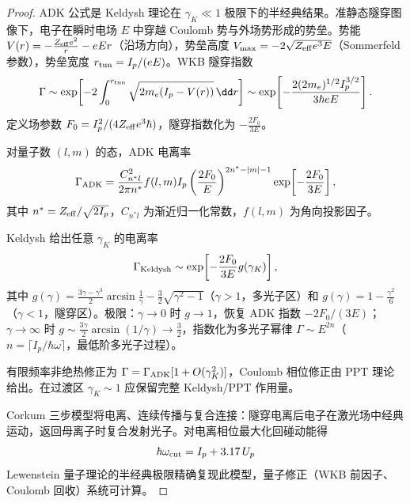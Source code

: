 \begin{proof}
ADK 公式是 Keldysh 理论在 \(\gamma_K\ll1\) 极限下的半经典结果。准静态隧穿图像下，电子在瞬时电场 \(E\) 中穿越 Coulomb 势与外场势形成的势垒。势能 \(V(r)=-\frac{Z_{\rm eff}e^2}{r}-eEr\)（沿场方向），势垒高度 \(V_{\rm max}=-2\sqrt{Z_{\rm eff}e^3E}\)（Sommerfeld 参数），势垒宽度 \(r_{\rm tun}=I_p/(eE)\)。WKB 隧穿指数
\begin{equation*}
  \Gamma\sim\exp\!\left[-2\int_0^{r_{\rm tun}}\sqrt{2m_e(I_p-V(r))}\,\dd r\right]\sim\exp\!\left[-\frac{2(2m_e)^{1/2}I_p^{3/2}}{3\hbar eE}\right].
\end{equation*}
定义场参数 \(F_0=I_p^2/(4Z_{\rm eff}e^3\hbar)\)，隧穿指数化为 \(-\frac{2F_0}{3E}\)。

对量子数 \((l,m)\) 的态，ADK 电离率
\begin{equation}
  \Gamma_{\rm ADK}=\frac{C_{n^*l}^2}{2\pi n^*}f(l,m)I_p\left(\frac{2F_0}{E}\right)^{2n^*-|m|-1}\exp\!\left[-\frac{2F_0}{3E}\right],
  \label{eq:strong-field-adk}
\end{equation}
其中 \(n^*=Z_{\rm eff}/\sqrt{2I_p}\)，\(C_{n^*l}\) 为渐近归一化常数，\(f(l,m)\) 为角向投影因子。

Keldysh 给出任意 \(\gamma_K\) 的电离率
\begin{equation*}
  \Gamma_{\rm Keldysh}\sim\exp\!\left[-\frac{2F_0}{3E}g(\gamma_K)\right],
\end{equation*}
其中 \(g(\gamma)=\frac{3\gamma-\gamma^3}{2}\arcsin\frac{1}{\gamma}-\frac{3}{2}\sqrt{\gamma^2-1}\)（\(\gamma>1\)，多光子区）和 \(g(\gamma)=1-\frac{\gamma^2}{6}\)（\(\gamma<1\)，隧穿区）。极限：\(\gamma\to0\) 时 \(g\to1\)，恢复 ADK 指数 \(-2F_0/(3E)\)；\(\gamma\to\infty\) 时 \(g\sim\frac{3\gamma}{2}\arcsin(1/\gamma)\to\frac{3}{2}\)，指数化为多光子幂律 \(\Gamma\sim E^{2n}\)（\(n=\lceil I_p/\hbar\omega\rceil\)，最低阶多光子过程）。

有限频率非绝热修正为 \(\Gamma=\Gamma_{\rm ADK}[1+O(\gamma_K^2)]\)，Coulomb 相位修正由 PPT 理论给出。在过渡区 \(\gamma_K\sim1\) 应保留完整 Keldysh/PPT 作用量。

Corkum 三步模型将电离、连续传播与复合连接：隧穿电离后电子在激光场中经典运动，返回母离子时复合发射光子。对电离相位最大化回碰动能得
\begin{equation}
  \hbar\omega_{\rm cut}=I_p+3.17\,U_p
  \label{eq:phys-sf-hhg-cutoff}
\end{equation}
Lewenstein 量子理论的半经典极限精确复现此模型，量子修正（WKB 前因子、Coulomb 回收）系统可计算。
\end{proof}
